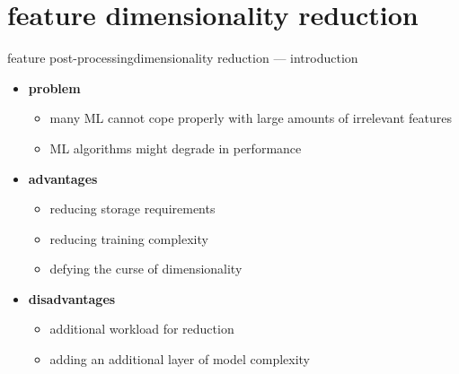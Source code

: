    \section[reduction]{feature dimensionality reduction}
		\begin{frame}{feature post-processing}{dimensionality reduction --- introduction}
            \begin{itemize}
                \item   \textbf{problem}
                    \begin{itemize}
                        \item   many ML cannot cope properly with large amounts of irrelevant features
                        \item   ML algorithms might degrade in performance
                    \end{itemize}
                \bigskip
                \item<2->   \textbf{advantages}
                    \begin{itemize}
                        \item   reducing storage requirements
                        \item   reducing training complexity
                        \item   defying the curse of dimensionality
                    \end{itemize}
                \bigskip
                \item<3->   \textbf{disadvantages}
                    \begin{itemize}
                        \item   additional workload for reduction
                        \item   adding an additional layer of model complexity
                    \end{itemize}
            \end{itemize}
		\end{frame}
